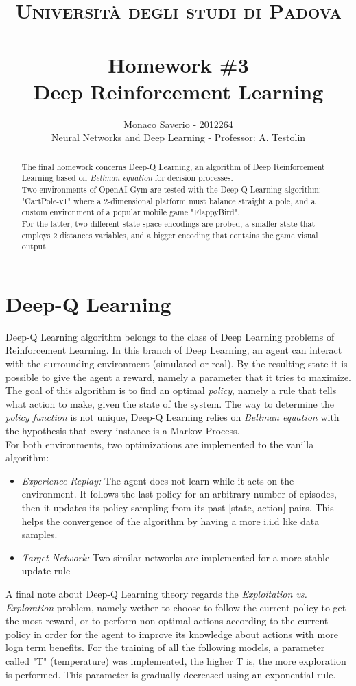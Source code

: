 \documentclass[11pt,a4paper,twocolumn]{IEEEtran}
\author{Monaco Saverio - 2012264 \sepline \\Neural Networks and Deep Learning - Professor: A. Testolin}
\title{{\normalsize\textsc{Università degli studi di Padova}}\vspace{-.5cm} \\ \sepline\\ \textbf{Homework \#3
\\ Deep Reinforcement Learning}}
\begin{document}
	\maketitle
	\begin{abstract} The final homework concerns Deep-Q Learning, an algorithm of Deep Reinforcement Learning based on \textit{Bellman equation} for decision processes.\\
	Two environments of OpenAI Gym are tested with the Deep-Q Learning algorithm: "CartPole-v1" where a 2-dimensional platform must balance straight a pole, and a custom environment of a popular mobile game "FlappyBird".\\
	For the latter, two different state-space encodings are probed, a smaller state that employs 2 distances variables, and a bigger encoding that contains the game visual output.
	\end{abstract}
    \section*{\textbf{Deep-Q Learning}}
    Deep-Q Learning algorithm belongs to the class of Deep Learning problems of Reinforcement Learning.
    In this branch of Deep Learning, an agent can interact with the surrounding environment (simulated or real). By the resulting state it is possible to give the agent a reward, namely a parameter that it tries to maximize.\\
    The goal of this algorithm is to find an optimal \textit{policy}, namely a rule that tells what action to make, given the state of the system. The way to determine the \textit{policy function} is not unique, Deep-Q Learning relies on \textit{Bellman equation} with the hypothesis that every instance is a Markov Process.\medskip\\
    For both environments, two optimizations are implemented to the vanilla algorithm:
    \begin{itemize}
		\item \textit{Experience Replay:} The agent does not learn while it acts on the environment. It follows the last policy for an arbitrary number of episodes, then it updates its policy sampling from its past [state, action] pairs. This helps the convergence of the algorithm by having a more i.i.d like data samples.
		\item \textit{Target Network:} Two similar networks are implemented for a more stable update rule
	\end{itemize}
	A final note about Deep-Q Learning theory regards the \textit{Exploitation vs. Exploration} problem, namely wether to choose to follow the current policy to get the most reward, or to perform non-optimal actions according to the current policy in order for the agent to improve its knowledge about actions with more logn term benefits. For the training of all the following models, a parameter called "T" (temperature) was implemented, the higher T is, the more exploration is performed. This parameter is gradually decreased using an exponential rule.
\end{document}
